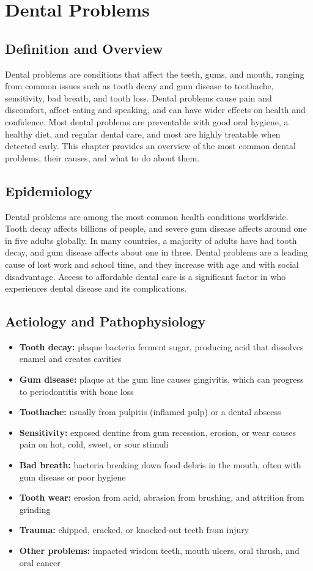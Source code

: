 \chapter{Dental Problems}

\section*{Definition and Overview}
Dental problems are conditions that affect the teeth, gums, and mouth, ranging from common issues such as tooth decay and gum disease to toothache, sensitivity, bad breath, and tooth loss. Dental problems cause pain and discomfort, affect eating and speaking, and can have wider effects on health and confidence. Most dental problems are preventable with good oral hygiene, a healthy diet, and regular dental care, and most are highly treatable when detected early. This chapter provides an overview of the most common dental problems, their causes, and what to do about them.

\section*{Epidemiology}
Dental problems are among the most common health conditions worldwide. Tooth decay affects billions of people, and severe gum disease affects around one in five adults globally. In many countries, a majority of adults have had tooth decay, and gum disease affects about one in three. Dental problems are a leading cause of lost work and school time, and they increase with age and with social disadvantage. Access to affordable dental care is a significant factor in who experiences dental disease and its complications.

\section*{Aetiology and Pathophysiology}
\begin{itemize}
    \item \textbf{Tooth decay:} plaque bacteria ferment sugar, producing acid that dissolves enamel and creates cavities
    \item \textbf{Gum disease:} plaque at the gum line causes gingivitis, which can progress to periodontitis with bone loss
    \item \textbf{Toothache:} usually from pulpitis (inflamed pulp) or a dental abscess
    \item \textbf{Sensitivity:} exposed dentine from gum recession, erosion, or wear causes pain on hot, cold, sweet, or sour stimuli
    \item \textbf{Bad breath:} bacteria breaking down food debris in the mouth, often with gum disease or poor hygiene
    \item \textbf{Tooth wear:} erosion from acid, abrasion from brushing, and attrition from grinding
    \item \textbf{Trauma:} chipped, cracked, or knocked-out teeth from injury
    \item \textbf{Other problems:} impacted wisdom teeth, mouth ulcers, oral thrush, and oral cancer
\end{itemize}

